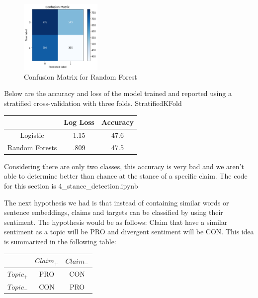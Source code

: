 \documentclass[11pt,a4paper]{article}
\begin{document}
\begin{figure}[H]
    \centering
    \includegraphics[width=0.35\textwidth]{stance_w2v_lr}
    \caption{\label{font-table} Confusion Matrix for Random Forest }
\end{figure} 

Below are the accuracy and loss of the model trained and reported using a stratified cross-validation with three folds.
StratifiedKFold
\begin{table}[H]
\begin{center}
\begin{tabular}{|c|c|c|}
\hline \bf & \bf Log Loss & \bf Accuracy \\ \hline
Logistic & 1.15 & 47.6 \\
Random Forests & .809 & 47.5 \\
\hline
\end{tabular}
\end{center}
\end{table}

Considering there are only two classes, this accuracy is very bad and we aren't able to determine better than chance at the stance of a specific claim.  The code for this section is 4\_stance\_detection.ipynb

The next hypothesis we had is that instead of containing similar words or sentence embeddings, claims and targets can be classified by using their sentiment.  The hypothesis would be as follows:  Claim that have a similar sentiment as a topic will be PRO and divergent sentiment will be CON.  This idea is summarized in the following table:

\begin{table}[H]
\begin{center}
\begin{tabular}{|c|c|c|}
\hline \bf & \bf $Claim_{+}$ & \bf $Claim_{-}$ \\ \hline
$Topic_{+}$ & PRO & CON \\
$Topic_{-}$ & CON & PRO \\
\hline
\end{tabular}
\end{center}
\end{table}
\end{document}
